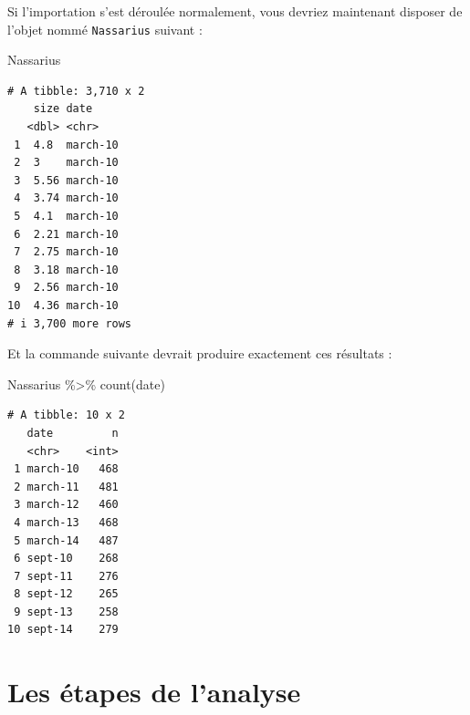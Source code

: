 \documentclass[
  a4paper,
  DIV=11,
  numbers=noendperiod,
  oneside]{scrreprt}
\newenvironment{Shaded}{}{}
\newcommand{\FunctionTok}[1]{\textcolor[rgb]{0.44,0.26,0.76}{#1}}
\newcommand{\NormalTok}[1]{\textcolor[rgb]{0.14,0.16,0.18}{#1}}
\newcommand{\SpecialCharTok}[1]{\textcolor[rgb]{0.00,0.36,0.77}{#1}}
\begin{document}
Si l'importation s'est déroulée normalement, vous devriez maintenant
disposer de l'objet nommé \texttt{Nassarius} suivant :

\begin{Shaded}
\begin{Highlighting}[]
\NormalTok{Nassarius}
\end{Highlighting}
\end{Shaded}

\begin{verbatim}
# A tibble: 3,710 x 2
    size date    
   <dbl> <chr>   
 1  4.8  march-10
 2  3    march-10
 3  5.56 march-10
 4  3.74 march-10
 5  4.1  march-10
 6  2.21 march-10
 7  2.75 march-10
 8  3.18 march-10
 9  2.56 march-10
10  4.36 march-10
# i 3,700 more rows
\end{verbatim}

Et la commande suivante devrait produire exactement ces résultats :

\begin{Shaded}
\begin{Highlighting}[]
\NormalTok{Nassarius }\SpecialCharTok{\%\textgreater{}\%}
  \FunctionTok{count}\NormalTok{(date)}
\end{Highlighting}
\end{Shaded}

\begin{verbatim}
# A tibble: 10 x 2
   date         n
   <chr>    <int>
 1 march-10   468
 2 march-11   481
 3 march-12   460
 4 march-13   468
 5 march-14   487
 6 sept-10    268
 7 sept-11    276
 8 sept-12    265
 9 sept-13    258
10 sept-14    279
\end{verbatim}


\hypertarget{les-uxe9tapes-de-lanalyse}{%
\section{Les étapes de l'analyse}\label{les-uxe9tapes-de-lanalyse}}
\end{document}
